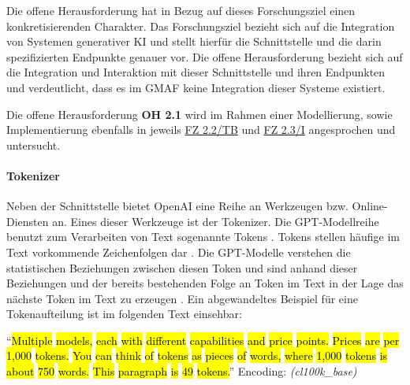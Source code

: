 Die offene Herausforderung  hat in Bezug auf dieses Forschungsziel einen konkretisierenden Charakter.
Das Forschungsziel bezieht sich auf die Integration von Systemen generativer KI und stellt hierfür die Schnittstelle und die darin spezifizierten Endpunkte genauer vor.
Die offene Herausforderung bezieht sich auf die Integration und Interaktion mit dieser Schnittstelle und ihren Endpunkten und verdeutlicht, dass es im GMAF keine Integration dieser Systeme existiert.

Die offene Herausforderung \textbf{OH 2.1} wird im Rahmen einer Modellierung, sowie Implementierung ebenfalls in jeweils \hyperref[sec3:model:subsec:fz-integration]{FZ 2.2/TB} und \hyperref[sec4:impl:subsec:fz-integration]{FZ 2.3/I} angesprochen und untersucht.

\paragraph{Tokenizer}
\label{sec2:sota:par:tokenizer}
Neben der Schnittstelle bietet OpenAI eine Reihe an Werkzeugen bzw. Online-Diensten an.
Eines dieser Werkzeuge ist der Tokenizer.
Die GPT-Modellreihe benutzt zum Verarbeiten von Text sogenannte Tokens \cite{openai-tokenizer}.
Tokens stellen häufige im Text vorkommende Zeichenfolgen dar \cite{openai-tokenizer}.
Die GPT-Modelle verstehen die statistischen Beziehungen zwischen diesen Token und sind anhand dieser Beziehungen und der bereits bestehenden Folge an Token im Text in der Lage das nächste Token im Text zu erzeugen \cite{openai-tokenizer}.
Ein abgewandeltes Beispiel für eine Tokenaufteilung ist im folgenden Text einsehbar:

\enquote{\hl{Multiple}\hl{ models}\hl{,}\hl{ each}\hl{ with}\hl{ different}\hl{ capabilities}\hl{ and}\hl{ price}\hl{ points}\hl{.}\hl{ Prices}\hl{ are}\hl{ per}\hl{ }\hl{1}\hl{,}\hl{000}\hl{ tokens}\hl{.}\hl{ You}\hl{ can}\hl{ think}\hl{ of}\hl{ tokens}\hl{ as}\hl{ pieces}\hl{ of}\hl{ words}\hl{,}\hl{ where}\hl{ }\hl{1}\hl{,}\hl{000}\hl{ tokens}\hl{ is}\hl{ about}\hl{ }\hl{750}\hl{ words}\hl{.}\hl{ This}\hl{ paragraph}\hl{ is}\hl{ }\hl{49}\hl{ tokens}\hl{.}} Encoding: \textit{(cl100k\_base)} \cite{openai-model-tiktoken}

